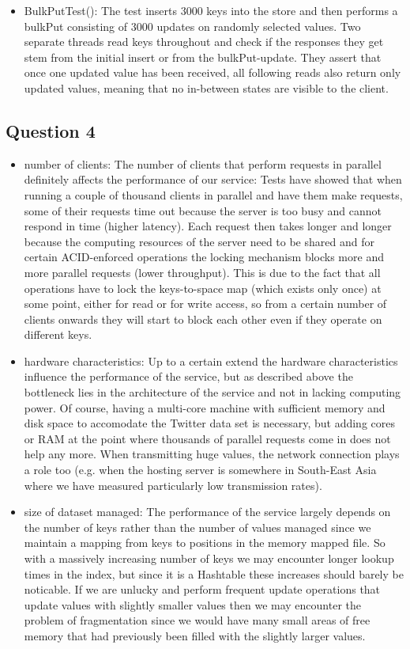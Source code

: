 \documentclass[12pt,a4paper]{article}
\begin{document}
\begin{itemize}
\item BulkPutTest(): The test inserts 3000  keys into the store and then performs a bulkPut consisting of 3000 updates on randomly selected values. Two separate threads read keys throughout and check if the responses they get stem from the initial insert or from the bulkPut-update. They assert that once one updated value has been received, all following reads also return only updated values, meaning that no in-between states are visible to the client.
\end{itemize}

\subsection*{Question 4}
\label{sec:pq4}
\begin{itemize}
  \item number of clients: The number of clients that perform requests in parallel definitely affects the performance of our service: Tests have showed that when running a couple of thousand clients in parallel and have them make requests, some of their requests time out because the server is too busy and cannot respond in time (higher latency). Each request then takes longer and longer because the computing resources of the server need to be shared and for certain ACID-enforced operations the locking mechanism blocks more and more parallel requests (lower throughput). This is due to the fact that all operations have to lock the keys-to-space map (which exists only once) at some point, either for read or for write access, so from a certain number of clients onwards they will start to block each other even if they operate on different keys.
  \item hardware characteristics: Up to a certain extend the hardware characteristics influence the performance of the service, but as described above the bottleneck lies in the architecture of the service and not in lacking computing power. Of course, having a multi-core machine with sufficient memory and disk space to accomodate the Twitter data set is necessary, but adding cores or RAM at the point where thousands of parallel requests come in does not help any more. When transmitting huge values, the network connection plays a role too (e.g. when the hosting server is somewhere in South-East Asia where we have measured particularly low transmission rates).
  \item size of dataset managed: The performance of the service largely depends on the number of keys rather than the number of values managed since we maintain a mapping from keys to positions in the memory mapped file. So with a massively increasing number of keys we may encounter longer lookup times in the index, but since it is a Hashtable these increases should barely be noticable. If we are unlucky and perform frequent update operations that update values with slightly smaller values then we may encounter the problem of fragmentation since we would have many small areas of free memory that had previously been filled with the slightly larger values.

\end{itemize}
\end{document}
